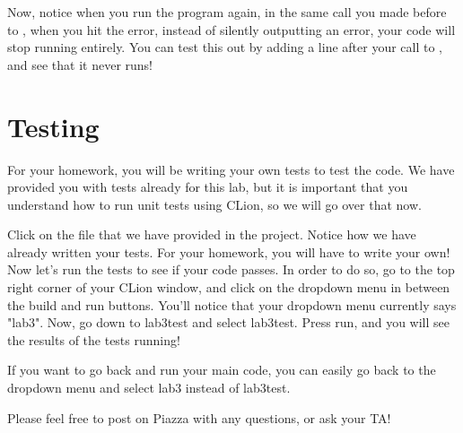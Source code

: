 \documentclass{tufte-handout}
\begin{document}
Now, notice when you run the program again, in the same call you made before to , when you hit the error, instead of silently outputting an error, your code will stop running entirely.  
You can test this out by adding a  line after your call to , and see that it never runs! 

\section{Testing}


For your homework, you will be writing your own tests to test the code.  We have provided you with tests already for this lab, but it is important that you understand how to run unit tests using CLion, so we will go over that now.

Click on the  file that we have provided in the project.  
Notice how we have already written your tests.  For your homework, you will have to write your own!
Now let's run the tests to see if your code passes.
In order to do so, go to the top right corner of your CLion window, and click on the dropdown menu in between the build and run buttons.
You'll notice that your dropdown menu currently says "lab3".
Now, go down to lab3test and select lab3test.
Press run, and you will see the results of the tests running!


If you want to go back and run your main code, you can easily go back to the dropdown menu and select lab3 instead of lab3test.  

Please feel free to post on Piazza with any questions, or ask your TA!  
\end{document}
